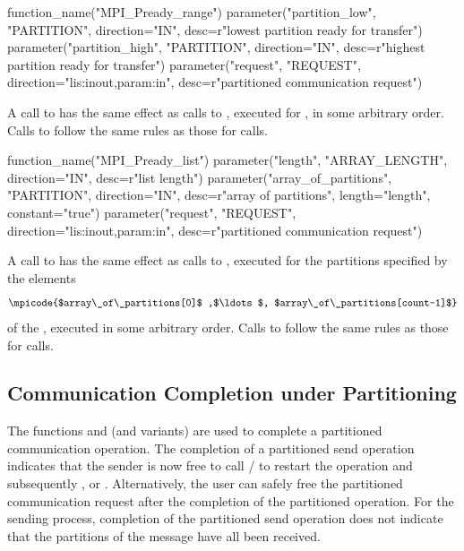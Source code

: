\begin{mpi-binding}
    function_name("MPI_Pready_range")
    parameter("partition_low", "PARTITION", direction="IN", desc=r"lowest partition ready for transfer")
    parameter("partition_high", "PARTITION", direction="IN", desc=r"highest partition ready for transfer")
    parameter("request", "REQUEST", direction="lis:inout,param:in", desc=r"partitioned communication request")
\end{mpi-binding}

A call to  has the same effect as calls to
, executed for , in some arbitrary order.
Calls to  follow the same rules as those for 
 calls.

\begin{mpi-binding}
    function_name("MPI_Pready_list")
    parameter("length", "ARRAY_LENGTH", direction="IN", desc=r"list length")
    parameter("array_of_partitions", "PARTITION", direction="IN", desc=r"array of partitions", length="length", constant="true")
    parameter("request", "REQUEST", direction="lis:inout,param:in", desc=r"partitioned communication request")
\end{mpi-binding}

A call to  has the same effect as calls to
, executed for the partitions specified by the elements
\[
\mpicode{$array\_of\_partitions[0]$ ,$\ldots$, $array\_of\_partitions[count-1]$}
\]
of the , executed in some arbitrary order.
Calls to  follow the same rules as those for
 calls.

\subsection{Communication Completion under Partitioning}
\label{subsec:part-commend}

The functions  and  (and
variants) are used to complete a partitioned
communication operation.  The completion of a partitioned send
operation indicates that the sender is now free to call / to restart
the operation and
subsequently ,  or
. Alternatively, the user can safely free 
the partitioned communication request after the completion of
the partitioned operation.
For the sending process, completion of the
partitioned send operation does not indicate that the
partitions of the message have all been received. 

